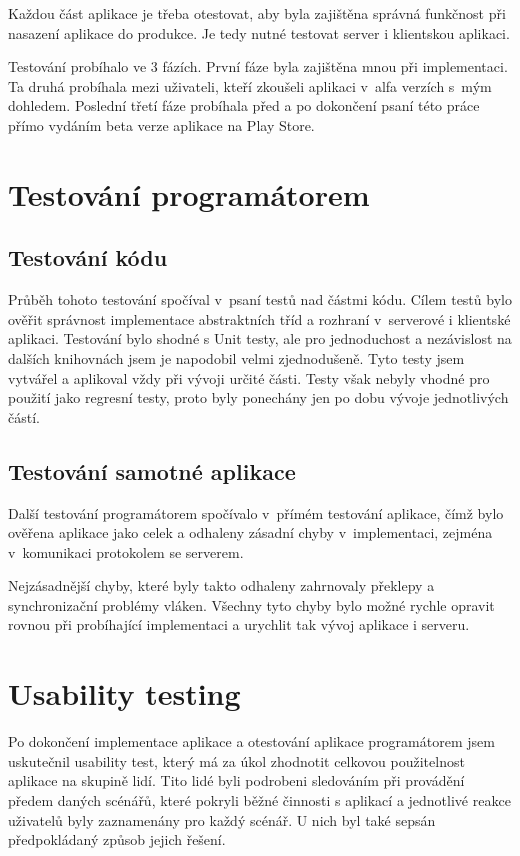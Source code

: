 \documentclass[thesis=B,czech]{FITthesis}[2013/10/20]
\begin{document}
Každou část aplikace je třeba otestovat, aby byla zajištěna správná funkčnost při nasazení aplikace do produkce. Je tedy nutné testovat server i klientskou aplikaci.

Testování probíhalo ve 3 fázích. První fáze byla zajištěna mnou při implementaci. Ta druhá probíhala mezi uživateli, kteří zkoušeli aplikaci v~alfa verzích s~mým dohledem. Poslední třetí fáze probíhala před a po dokončení psaní této práce přímo vydáním beta verze aplikace na Play Store.

\section{Testování programátorem}

\subsection{Testování kódu}

Průběh tohoto testování spočíval v~psaní testů nad částmi kódu. Cílem testů bylo ověřit správnost implementace abstraktních tříd a rozhraní v~serverové i klientské aplikaci. Testování bylo shodné s Unit testy, ale pro jednoduchost a nezávislost na dalších knihovnách jsem je napodobil velmi zjednodušeně. Tyto testy jsem vytvářel a aplikoval vždy při vývoji určité části. Testy však nebyly vhodné pro použití jako regresní testy, proto byly ponechány jen po dobu vývoje jednotlivých částí.

\subsection{Testování samotné aplikace}

Další testování programátorem spočívalo v~přímém testování aplikace, čímž bylo ověřena aplikace jako celek a odhaleny zásadní chyby v~implementaci, zejména v~komunikaci protokolem se serverem.

Nejzásadnější chyby, které byly takto odhaleny zahrnovaly překlepy a synchronizační problémy vláken. Všechny tyto chyby bylo možné rychle opravit rovnou při probíhající implementaci a urychlit tak vývoj aplikace i serveru.

\section{Usability testing}

Po dokončení implementace aplikace a otestování aplikace programátorem jsem uskutečnil usability test, který má za úkol zhodnotit celkovou použitelnost aplikace na skupině lidí. Tito lidé byli podrobeni sledováním při provádění předem daných scénářů, které pokryli běžné činnosti s aplikací a jednotlivé reakce uživatelů byly zaznamenány pro každý scénář. U nich byl také sepsán předpokládaný způsob jejich řešení.
\end{document}
